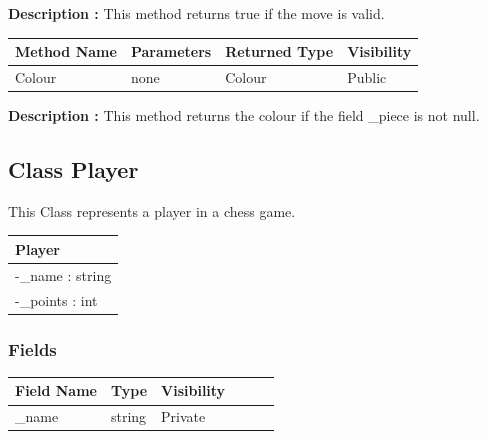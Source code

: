 \documentclass[12pt]{article}
\begin{document}
\textbf{Description :} This method returns true if the move is valid.

\begin{table}[H]
    \begin{tabular}{|l|l|l|l|}
    \hline
    \rowcolor[HTML]{EFEFEF} 
    \cellcolor[HTML]{EFEFEF}\textbf{Method Name} & \textbf{Parameters}     & \textbf{Returned Type} & \textbf{Visibility} \\ \hline
    Colour                                       & none                    & Colour                   & Public              \\ \hline
    \end{tabular}
\end{table}

\textbf{Description :} This method returns the colour if the field \_piece is not null.

\newpage


\subsection{Class Player}

This Class represents a player in a chess game.

\begin{table}[H]
    \begin{tabular}{|l|}
    \hline
    \rowcolor[HTML]{C0C0C0} 
    \textbf{Player}          \\ \hline
    \rowcolor[HTML]{EFEFEF}
    -\_name : string        \\ \hline
    -\_points : int         \\ \hline
    \end{tabular}
\end{table}

\subsubsection{Fields}

\begin{table}[H]
    \begin{tabular}{llllll}
    \hline
    \multicolumn{1}{|l|}{\cellcolor[HTML]{EFEFEF}\textbf{Field Name}} & \multicolumn{1}{l|}{\cellcolor[HTML]{EFEFEF}\textbf{Type}} & \multicolumn{1}{l|}{\cellcolor[HTML]{EFEFEF}\textbf{Visibility}} \\ \hline
    \multicolumn{1}{|l|}{\_name}                                      & \multicolumn{1}{l|}{string}                                & \multicolumn{1}{l|}{Private}                                     \\ \hline
    \end{tabular}
\end{table}
\end{document}
